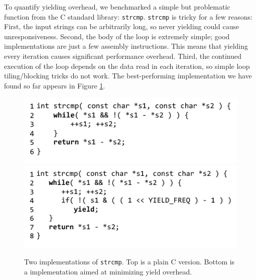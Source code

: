 \documentclass[acmsmall,anonymous,review]{acmart}\settopmatter{printfolios=true,printccs=false,printacmref=false}
\begin{document}
To quantify yielding overhead, we benchmarked a simple but problematic function from the C standard library: \texttt{strcmp}.
\texttt{strcmp} is tricky for a few reasons:
First, the input strings can be arbitrarily long, so never yielding could cause unresponsiveness.
Second, the body of the loop is extremely simple; good implementations are just a few assembly instructions.
This means that yielding every iteration causes significant performance overhead.
Third, the continued execution of the loop depends on the data read in each iteration, so simple loop tiling/blocking tricks do not work.
The best-performing implementation we have found so far appears in Figure \ref{fig:strcmp}.

\begin{figure}[htp]
\includegraphics[left]{plain_strcmp}%
  \\
\includegraphics[left]{strcmp_benchmark}%
\caption{Two implementations of \texttt{strcmp}.
  Top is a plain C version.
  Bottom is a \charcoal{} implementation aimed at minimizing yield overhead.}

\label{fig:strcmp}

\end{figure}


\end{document}

